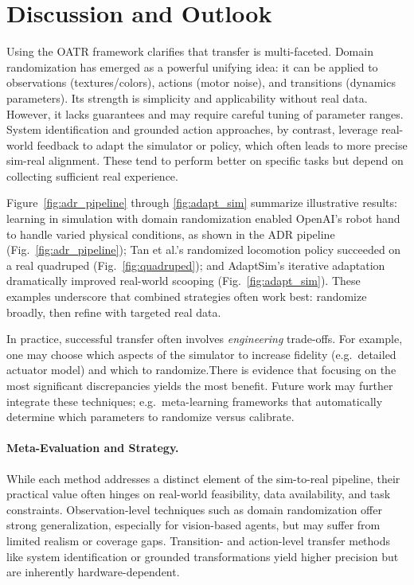 \section{Discussion and Outlook}
Using the OATR framework clarifies that \simtoreal transfer is multi-faceted. Domain randomization has emerged as a powerful unifying idea: it can be applied to observations (textures/colors), actions (motor noise), and transitions (dynamics parameters). Its strength is simplicity and applicability without real data\cite{Tobin2017,Sadeghi2017,Akkaya2019}. However, it lacks guarantees and may require careful tuning of parameter ranges. System identification and grounded action approaches, by contrast, leverage real-world feedback to adapt the simulator or policy, which often leads to more precise sim-real alignment\cite{Chebotar2019,Hanna2017,Ren2023}. These tend to perform better on specific tasks but depend on collecting sufficient real experience.

Figure~\ref{fig:adr_pipeline} through \ref{fig:adapt_sim} summarize illustrative results: learning in simulation with domain randomization enabled OpenAI’s robot hand to handle varied physical conditions, as shown in the ADR pipeline (Fig.~\ref{fig:adr_pipeline}); Tan et al.’s randomized locomotion policy succeeded on a real quadruped (Fig.~\ref{fig:quadruped}); and AdaptSim’s iterative adaptation dramatically improved real-world scooping (Fig.~\ref{fig:adapt_sim}). These examples underscore that combined strategies often work best: randomize broadly, then refine with targeted real data.

In practice, successful \simtoreal transfer often involves \emph{engineering} trade-offs. For example, one may choose which aspects of the simulator to increase fidelity (e.g.\ detailed actuator model) and which to randomize.There is evidence that focusing on the most significant discrepancies yields the most benefit. Future work may further integrate these techniques; e.g.\ meta-learning frameworks that automatically determine which parameters to randomize versus calibrate.

\paragraph{Meta-Evaluation and Strategy.}
While each method addresses a distinct element of the sim-to-real pipeline, their practical value often hinges on real-world feasibility, data availability, and task constraints. Observation-level techniques such as domain randomization offer strong generalization, especially for vision-based agents, but may suffer from limited realism or coverage gaps. Transition- and action-level transfer methods like system identification or grounded transformations yield higher precision but are inherently hardware-dependent.

